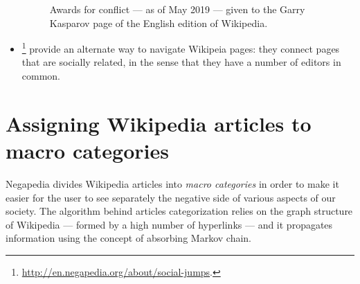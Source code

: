 \begin{itemize}
\begin{figure}
                    \caption{Awards for conflict --- as of May 2019 --- given to the Garry Kasparov page of the English edition of Wikipedia.}
                    \label{awards}
                \end{figure}
                \item {}\footnote{\url{http://en.negapedia.org/about/social-jumps}.} provide an alternate way to navigate Wikipeia pages: they connect pages that are socially related, in the sense that they have a number of editors in common.
            \end{itemize}
    \section{Assigning Wikipedia articles to macro categories}\label{negapedia_categories}
        Negapedia divides Wikipedia articles into \emph{macro categories} in order to make it easier for the user to see separately the negative side of various aspects of our society. The algorithm behind articles categorization relies on the graph structure of Wikipedia --- formed by a high number of hyperlinks --- and it propagates information using the concept of absorbing Markov chain.
